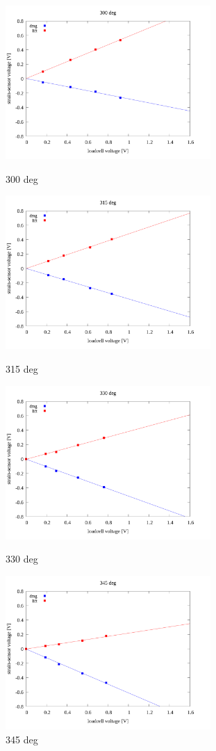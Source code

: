 \documentclass[twocolumn,a4j]{jsarticle}
\begin{document}
\begin{figure}[htbp]
    \footnotesize
    \begin{center}
        \includegraphics[width=78mm]{../images/linear/300_linear.png}
        \caption{300 deg}
        \includegraphics[width=78mm]{../images/linear/315_linear.png}
        \caption{315 deg}
        \includegraphics[width=78mm]{../images/linear/330_linear.png}
        \caption{330 deg}
        \includegraphics[width=78mm]{../images/linear/345_linear.png}
        \caption{345 deg}
    \end{center}
\end{figure}
\end{document}
